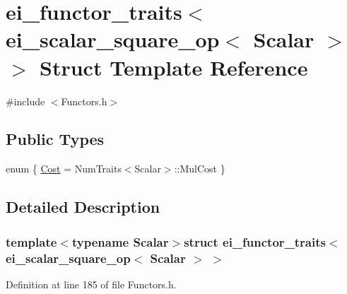 \hypertarget{structei__functor__traits_3_01ei__scalar__square__op_3_01_scalar_01_4_01_4}{\section{ei\-\_\-functor\-\_\-traits$<$ ei\-\_\-scalar\-\_\-square\-\_\-op$<$ Scalar $>$ $>$ Struct Template Reference}
\label{structei__functor__traits_3_01ei__scalar__square__op_3_01_scalar_01_4_01_4}
}


{\ttfamily \#include $<$Functors.\-h$>$}

\subsection*{Public Types}
\begin{DoxyCompactItemize}
\item 
enum \{ \hyperlink{structei__functor__traits_3_01ei__scalar__square__op_3_01_scalar_01_4_01_4_ae3f1c226a01cffdde99de62dcde38373af237e3d159c8508638a2a21e092eac9b}{Cost} = Num\-Traits$<$Scalar$>$\-:\-:Mul\-Cost
 \}
\end{DoxyCompactItemize}


\subsection{Detailed Description}
\subsubsection*{template$<$typename Scalar$>$struct ei\-\_\-functor\-\_\-traits$<$ ei\-\_\-scalar\-\_\-square\-\_\-op$<$ Scalar $>$ $>$}



Definition at line 185 of file Functors.\-h.



